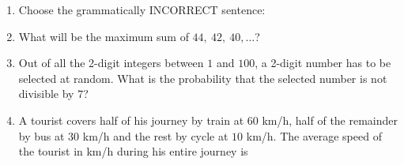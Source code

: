 \documentclass[journal]{IEEEtran}
\begin{document}
\begin{enumerate}[leftmargin=0pt]
\item Choose the grammatically INCORRECT sentence:
\begin{enumerate}
\end{enumerate}
\hfill{}

\item What will be the maximum sum of $44,\ 42,\ 40, \ldots$?
\begin{enumerate}
\end{enumerate}
\hfill{}

\item Out of all the 2-digit integers between $1$ and $100$, a 2-digit number has to be selected at random. What is the probability that the selected number is not divisible by $7$?
\begin{enumerate}
\end{enumerate}
\hfill{}

\item A tourist covers half of his journey by train at $60$ km/h, half of the remainder by bus at $30$ km/h and the rest by cycle at $10$ km/h. The average speed of the tourist in km/h during his entire journey is
\begin{enumerate}
\end{enumerate}
\hfill{}


\end{enumerate}
\end{document}
